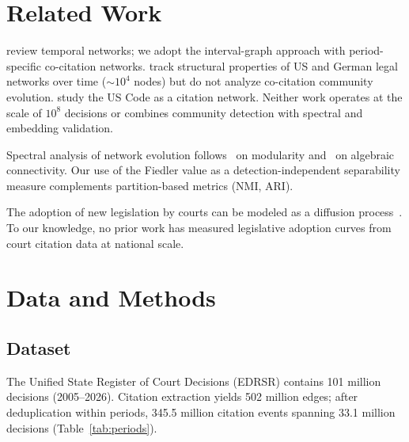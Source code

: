 \documentclass[11pt]{article}
\begin{document}
\section{Related Work}
\label{sec:related}

\citet{holme2012temporal} review temporal networks; we adopt the interval-graph approach with period-specific co-citation networks.
\citet{coupette2021measuring} track structural properties of US and German legal networks over time (${\sim}10^4$ nodes) but do not analyze co-citation community evolution.
\citet{bommarito2010mathematical} study the US Code as a citation network.
Neither work operates at the scale of $10^8$ decisions or combines community detection with spectral and embedding validation.

Spectral analysis of network evolution follows~\citet{newman2004finding} on modularity and~\citet{fiedler1973algebraic} on algebraic connectivity.
Our use of the Fiedler value as a detection-independent separability measure complements partition-based metrics (NMI, ARI).

The adoption of new legislation by courts can be modeled as a diffusion process~\citep{rogers1962diffusion}.
To our knowledge, no prior work has measured legislative adoption curves from court citation data at national scale.

\section{Data and Methods}
\label{sec:methods}

\subsection{Dataset}

The Unified State Register of Court Decisions (EDRSR) contains 101 million decisions (2005--2026).
Citation extraction yields 502 million edges; after deduplication within periods, 345.5 million citation events spanning 33.1 million decisions (Table~\ref{tab:periods}).
\end{document}
